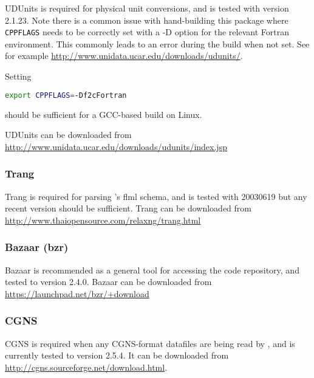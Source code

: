 UDUnits is required for physical unit conversions, and is tested with version
2.1.23. Note there is a common issue with hand-building this package where
\lstinline[language=bash]+CPPFLAGS+ needs to be correctly set with a -D
option for the relevant Fortran environment. This commonly leads to an error
during the build when not set. See for example
\url{http://www.unidata.ucar.edu/downloads/udunits/}.

Setting

\begin{lstlisting}[language=bash]
export CPPFLAGS=-Df2cFortran
\end{lstlisting}

should be sufficient for a GCC-based build on Linux.

UDUnits can be downloaded from \url{http://www.unidata.ucar.edu/downloads/udunits/index.jsp}

\subsubsection{Trang}
\label{sec:required_libraries_supporting_trang}

Trang is required for parsing \fluidity's flml schema, and is tested with
20030619 but any recent version should be sufficient. Trang can be downloaded
from \url{http://www.thaiopensource.com/relaxng/trang.html}

\subsubsection{Bazaar (bzr)}
\label{sec:required_libraries_supporting_bzr}

Bazaar is recommended as a general tool for accessing the \fluidity code
repository, and tested to version 2.4.0. Bazaar can be
downloaded from \url{https://launchpad.net/bzr/+download}

\subsubsection{CGNS}
\label{sec:required_libraries_supporting_cgns}

CGNS is required when any CGNS-format datafiles are being read by \fluidity, and
is currently tested to version 2.5.4. It can be downloaded from 
\url{http://cgns.sourceforge.net/download.html}.
